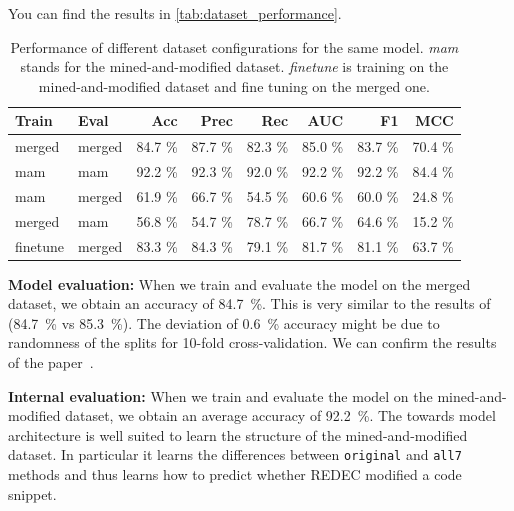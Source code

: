 \documentclass[%
class=scrreprt,
chapterprefix=false,%
open=right,%
twoside=false,%
paper=a4,%
logofile={Logo\_zentral\_farbig\_EN.png},%
thesistype=master,%
UKenglish,%
]{se2thesis}
\theoremstyle{definition}
\newcommand{\rdh}{REDEC\xspace}
\begin{document}
	You can find the results in \autoref{tab:dataset_performance}.
		
	\begin{table}[tb]
		\centering
		\caption{Performance of different dataset configurations for the same model. \textit{mam} stands for the mined-and-modified dataset. \textit{finetune} is training on the mined-and-modified dataset and fine tuning on the merged one.
		}
		\label{tab:dataset_performance}
		\begin{tabular}{llrrrrrr}
			\toprule
			Train & Eval & Acc & Prec & Rec & AUC & F1 & MCC \\
			\midrule
			merged      & merged   	& 84.7 \% & 87.7 \% & 82.3 \% & 85.0 \% & 83.7 \% & 70.4 \% \\
			mam        	& mam    	& 92.2 \% & 92.3 \% & 92.0 \% & 92.2 \% & 92.2 \% & 84.4 \% \\
			mam			& merged    & 61.9 \% & 66.7 \% & 54.5 \% & 60.6 \% & 60.0 \% & 24.8 \% \\
			merged      & mam	    & 56.8 \% & 54.7 \% & 78.7 \% & 66.7 \% & 64.6 \% & 15.2 \% \\
			finetune	& merged    & 83.3 \% & 84.3 \% & 79.1 \% & 81.7 \% & 81.1 \% & 63.7 \% \\
			\bottomrule
		\end{tabular}
	\end{table}
	
	\textbf{Model evaluation:}
	When we train and evaluate the model on the merged dataset, we obtain an accuracy of 84.7~\%. This is very similar to the results of \citeauthor{mi2022towards} (84.7~\% vs 85.3~\%). The deviation of 0.6~\% accuracy might be due to randomness of the splits for 10-fold cross-validation. We can confirm the results of the paper~\cite{mi2022towards}.
	
	\textbf{Internal evaluation:}
	When we train and evaluate the model on the mined-and-modified dataset, we obtain an average accuracy of 92.2~\%.
	The towards model architecture is well suited to learn the structure of the mined-and-modified dataset. In particular it learns the differences between \texttt{original} and \texttt{all7} methods and thus learns how to predict whether \rdh modified a code snippet. 
\end{document}
